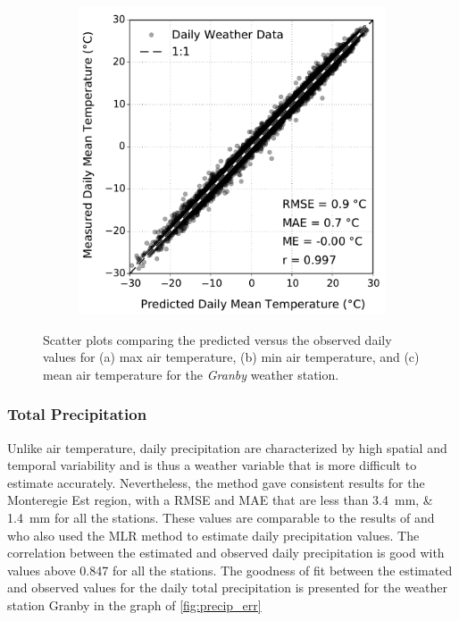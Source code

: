 \documentclass[TechnicalNoteMeteo.tex]{subfiles}
\begin{document}
\begin{figure}[!bh]
\begin{subfigure}{0.3\textwidth}
        \caption{}
        \label{subfig:mintemp_err}                
    \end{subfigure}
    \hspace{0.04\textwidth}
    \begin{subfigure}{0.3\textwidth}
        \includegraphics[width=\textwidth]{img/Mean_Temp_(deg_C)}
        \caption{}
        \label{subfig:meantemp_err}                
    \end{subfigure}
    \caption{Scatter plots comparing the predicted versus the observed daily values for (a) max air temperature, (b) min air temperature, and (c) mean air temperature for the \emph{Granby} weather station.}
    \label{fig:temp_err}
\end{figure}

\subsubsection{Total Precipitation}

Unlike air temperature, daily precipitation are characterized by high spatial and temporal variability and is thus a weather variable that is more difficult to estimate accurately. Nevertheless, the method gave consistent results for the Monteregie Est region, with a RMSE and MAE that are less than \SIlist{3.4;1.4}{mm} for all the stations. These values are comparable to the results of \cite{xia_forest_1999} and \cite{eischeid_creating_2000} who also used the MLR method to estimate daily precipitation values. The correlation between the estimated and observed daily precipitation is good with values above 0.847 for all the stations. The goodness of fit between the estimated and observed values for the daily total precipitation is presented for the weather station Granby in the graph of \cref{fig:precip_err}
\end{document}
